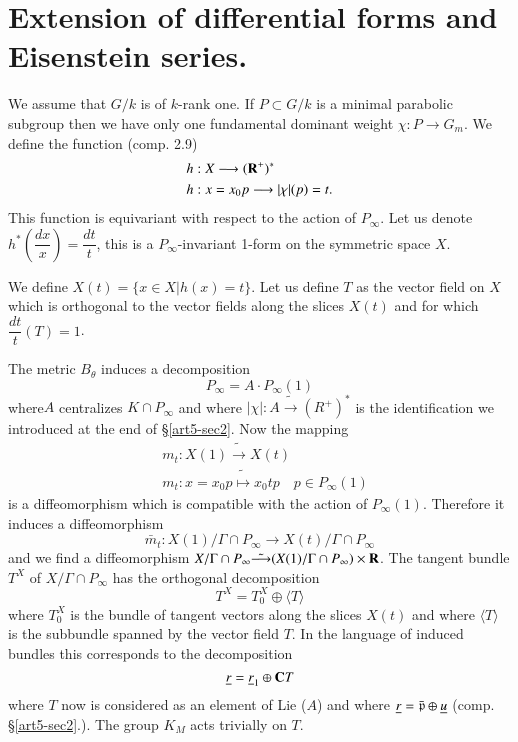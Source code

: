 \section{Extension of differential forms and Eisenstein series.}\label{art5-sec3}
We assume that $G / k$ is of $k$-rank one. If $P\subset G/k$ is a minimal parabolic subgroup then we have only one fundamental dominant weight $\chi: P\longrightarrow G_m$. We define the function (comp. 2.9)
\begin{align*}
& h : X \longrightarrow (\mathbf{R}^+)^\ast\\
& h : x = x_0 p \longrightarrow |\chi|(p) = t.
\end{align*}
This function is equivariant with respect to the action of $P_\infty$. Let us denote $h^\ast \left(\dfrac{dx}{x} \right) = \dfrac{dt}{t}$, this is a $P_\infty$-invariant 1-form on the symmetric space $X$.

We define $X (t) = \{x \in X | h(x) = t\}$. Let us define $T$ as the vector field on $X$ which is orthogonal to the vector fields along the slices $X (t)$ and for which $\dfrac{dt}{t} (T) = 1$.

The metric $B_\theta$ induces a decomposition
$$
P_\infty = A \cdot P_\infty (1)
$$
where\pageoriginale $A$ centralizes $K \cap P_\infty$ and where $|\chi| : A \tilde{\longrightarrow} (R^+)^\ast$ is the identification we introduced at the end of \S \ref{art5-sec2}. Now the mapping
\begin{align*}
& m_t : X(1) \tilde{\longrightarrow} X (t)\\
&  m_t : x = x_0 p \tilde{\longmapsto} x_0 t p \quad p \in P_\infty (1)
\end{align*}
is a diffeomorphism which is compatible with the action of $P_\infty (1)$. Therefore it induces a diffeomorphism
$$
\bar{m}_t : X (1) / \Gamma \cap P_\infty \longrightarrow X (t) / \Gamma \cap P_\infty
$$
and we find a diffeomorphism $X/ \Gamma \cap P_\infty\tilde{\longrightarrow} (X(1)/ \Gamma \cap P_\infty) \times \mathbf{R}$. The tangent bundle $T^X$ of $X / \Gamma \cap P_\infty$ has the orthogonal decomposition 
$$
T^X = T^X_0 \oplus \langle T \rangle
$$
where $T^X_0$ is the bundle of tangent vectors along the slices $X(t)$ and where $\langle T \rangle$ is the subbundle spanned by the vector field $T$. In the language of induced bundles this corresponds to the decomposition
$$
\underline{r} = \underline{r}_1 \oplus \mathbf{C} T
$$
where $T$ now is considered as an element of Lie ($A$) and where $\underline{r} = \bar{\mathfrak{p}} \oplus \underline{u}$ (comp. \S \ref{art5-sec2}.). The group $K_M$ acts trivially on $T$. 

